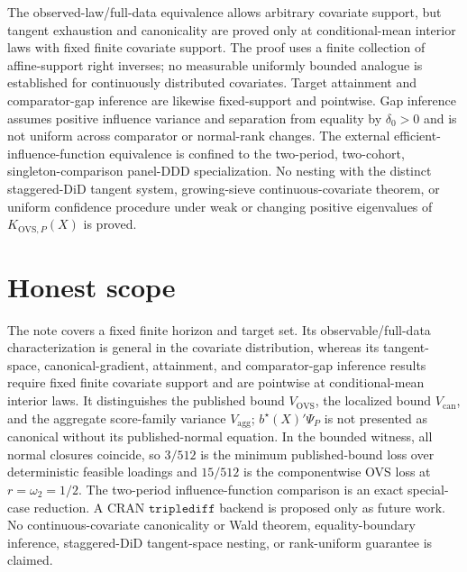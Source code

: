 \documentclass{article}
\begin{document}
The observed-law/full-data equivalence allows arbitrary covariate support, but tangent exhaustion and canonicality are proved only at conditional-mean interior laws with fixed finite covariate support.  The proof uses a finite collection of affine-support right inverses; no measurable uniformly bounded analogue is established for continuously distributed covariates.  Target attainment and comparator-gap inference are likewise fixed-support and pointwise.  Gap inference assumes positive influence variance and separation from equality by \(\delta_0>0\) and is not uniform across comparator or normal-rank changes.  The external efficient-influence-function equivalence is confined to the two-period, two-cohort, singleton-comparison panel-DDD specialization.  No nesting with the distinct staggered-DiD tangent system, growing-sieve continuous-covariate theorem, or uniform confidence procedure under weak or changing positive eigenvalues of \(K_{\mathrm{OVS},P}(X)\) is proved.

\section{Honest scope}

The note covers a fixed finite horizon and target set.  Its observable/full-data characterization is general in the covariate distribution, whereas its tangent-space, canonical-gradient, attainment, and comparator-gap inference results require fixed finite covariate support and are pointwise at conditional-mean interior laws.  It distinguishes the published bound \(V_{\mathrm{OVS}}\), the localized bound \(V_{\mathrm{can}}\), and the aggregate score-family variance \(V_{\mathrm{agg}}\); \(b^\star(X)'\Psi_P\) is not presented as canonical without its published-normal equation.  In the bounded witness, all normal closures coincide, so \(3/512\) is the minimum published-bound loss over deterministic feasible loadings and \(15/512\) is the componentwise OVS loss at \(r=\omega_2=1/2\).  The two-period influence-function comparison is an exact special-case reduction.  A CRAN \(\texttt{triplediff}\) backend is proposed only as future work.  No continuous-covariate canonicality or Wald theorem, equality-boundary inference, staggered-DiD tangent-space nesting, or rank-uniform guarantee is claimed.
\end{document}
